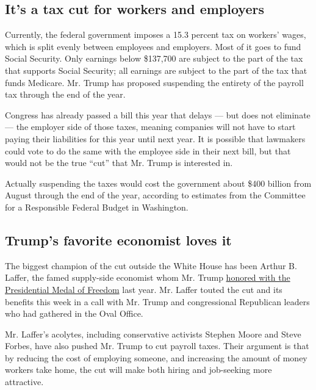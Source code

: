 \hypertarget{its-a-tax-cut-for-workers-and-employers}{%
\subsection{It's a tax cut for workers and
employers}\label{its-a-tax-cut-for-workers-and-employers}}

Currently, the federal government imposes a 15.3 percent tax on workers'
wages, which is split evenly between employees and employers. Most of it
goes to fund Social Security. Only earnings below \$137,700 are subject
to the part of the tax that supports Social Security; all earnings are
subject to the part of the tax that funds Medicare. Mr. Trump has
proposed suspending the entirety of the payroll tax through the end of
the year.

Congress has already passed a bill this year that delays --- but does
not eliminate --- the employer side of those taxes, meaning companies
will not have to start paying their liabilities for this year until next
year. It is possible that lawmakers could vote to do the same with the
employee side in their next bill, but that would not be the true ``cut''
that Mr. Trump is interested in.

Actually suspending the taxes would cost the government about \$400
billion from August through the end of the year, according to estimates
from the Committee for a Responsible Federal Budget in Washington.

\hypertarget{trumps-favorite-economist-loves-it}{%
\subsection{Trump's favorite economist loves
it}\label{trumps-favorite-economist-loves-it}}

The biggest champion of the cut outside the White House has been Arthur
B. Laffer, the famed supply-side economist whom Mr. Trump
\href{https://www.nytimes.com/2019/06/19/us/politics/arthur-laffer-medal-of-freedom.html}{honored
with the Presidential Medal of Freedom} last year. Mr. Laffer touted the
cut and its benefits this week in a call with Mr. Trump and
congressional Republican leaders who had gathered in the Oval Office.

Mr. Laffer's acolytes, including conservative activists Stephen Moore
and Steve Forbes, have also pushed Mr. Trump to cut payroll taxes. Their
argument is that by reducing the cost of employing someone, and
increasing the amount of money workers take home, the cut will make both
hiring and job-seeking more attractive.

